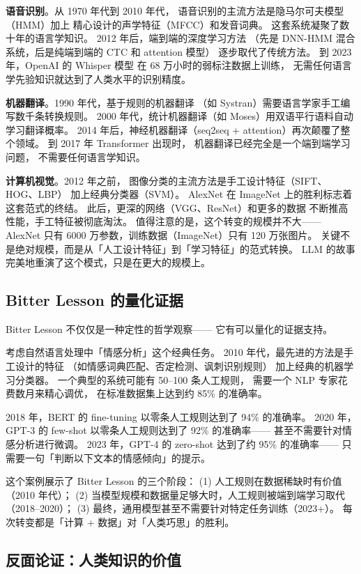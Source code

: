 \textbf{语音识别}。从 1970 年代到 2010 年代，
语音识别的主流方法是隐马尔可夫模型（HMM）加上
精心设计的声学特征（MFCC）和发音词典。
这套系统凝聚了数十年的语言学知识。
2012 年后，端到端的深度学习方法
（先是 DNN-HMM 混合系统，后是纯端到端的 CTC 和 attention 模型）
逐步取代了传统方法。
到 2023 年，OpenAI 的 Whisper 模型
在 68 万小时的弱标注数据上训练，
无需任何语言学先验知识就达到了人类水平的识别精度。

\textbf{机器翻译}。1990 年代，基于规则的机器翻译
（如 Systran）需要语言学家手工编写数千条转换规则。
2000 年代，统计机器翻译（如 Moses）用双语平行语料自动学习翻译概率。
2014 年后，神经机器翻译（seq2seq + attention）再次颠覆了整个领域。
到 2017 年 Transformer 出现时，
机器翻译已经完全是一个端到端学习问题，
不需要任何语言学知识。

\textbf{计算机视觉}。2012 年之前，
图像分类的主流方法是手工设计特征（SIFT、HOG、LBP）
加上经典分类器（SVM）。
AlexNet 在 ImageNet 上的胜利标志着这套范式的终结。
此后，更深的网络（VGG、ResNet）和更多的数据
不断推高性能，手工特征被彻底淘汰。
值得注意的是，这个转变的规模并不大——
AlexNet 只有 6000 万参数，训练数据（ImageNet）只有 120 万张图片。
关键不是绝对规模，而是从「人工设计特征」到「学习特征」的范式转换。
LLM 的故事完美地重演了这个模式，只是在更大的规模上。

\subsection{Bitter Lesson 的量化证据}

Bitter Lesson 不仅仅是一种定性的哲学观察——
它有可以量化的证据支持。

考虑自然语言处理中「情感分析」这个经典任务。
2010 年代，最先进的方法是手工设计的特征
（如情感词典匹配、否定检测、讽刺识别规则）
加上经典的机器学习分类器。
一个典型的系统可能有 50--100 条人工规则，
需要一个 NLP 专家花费数月来精心调优，
在标准数据集上达到约 85\% 的准确率。

2018 年，BERT 的 fine-tuning 以零条人工规则达到了 94\% 的准确率。
2020 年，GPT-3 的 few-shot 以零条人工规则达到了 92\% 的准确率——
甚至不需要针对情感分析进行微调。
2023 年，GPT-4 的 zero-shot 达到了约 95\% 的准确率——
只需要一句「判断以下文本的情感倾向」的提示。

这个案例展示了 Bitter Lesson 的三个阶段：
(1) 人工规则在数据稀缺时有价值（2010 年代）；
(2) 当模型规模和数据量足够大时，人工规则被端到端学习取代（2018--2020）；
(3) 最终，通用模型甚至不需要针对特定任务训练（2023+）。
每次转变都是「计算 + 数据」对「人类巧思」的胜利。

\subsection{反面论证：人类知识的价值}

